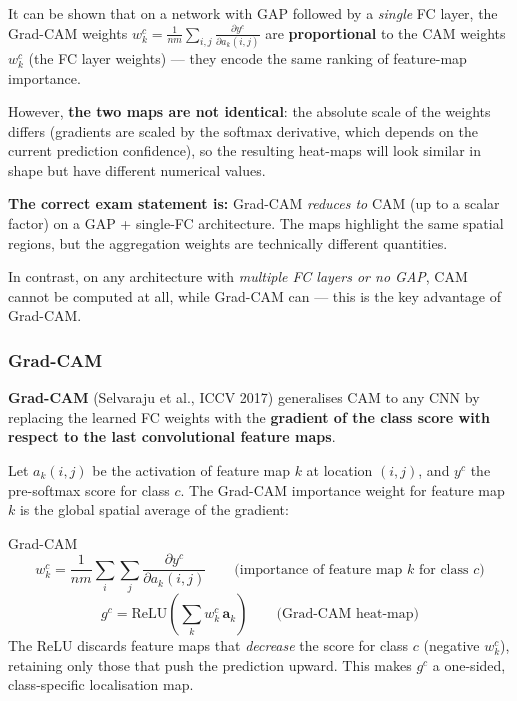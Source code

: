 \documentclass[11pt,a4paper]{article}
\newcommand{\term}[1]{\textcolor{DefGreen}{\textbf{#1}}\index{#1}}
\begin{document}
\begin{warnbox}
It can be shown that on a network with GAP followed by a \emph{single} FC layer, the Grad-CAM weights $w_k^c = \frac{1}{nm}\sum_{i,j}\frac{\partial y^c}{\partial a_k(i,j)}$ are \textbf{proportional} to the CAM weights $w_k^c$ (the FC layer weights) — they encode the same ranking of feature-map importance.

However, \textbf{the two maps are not identical}: the absolute scale of the weights differs (gradients are scaled by the softmax derivative, which depends on the current prediction confidence), so the resulting heat-maps will look similar in shape but have different numerical values.

\textbf{The correct exam statement is:} Grad-CAM \emph{reduces to} CAM (up to a scalar factor) on a GAP + single-FC architecture. The maps highlight the same spatial regions, but the aggregation weights are technically different quantities.

In contrast, on any architecture with \emph{multiple FC layers or no GAP}, CAM cannot be computed at all, while Grad-CAM can — this is the key advantage of Grad-CAM.
\end{warnbox}

\subsubsection{Grad-CAM}
\label{sec:gradcam2}

\term{Grad-CAM} (Selvaraju et al., ICCV 2017) generalises CAM to any CNN by replacing the learned FC weights with the \textbf{gradient of the class score with respect to the last convolutional feature maps}.

Let $a_k(i,j)$ be the activation of feature map $k$ at location $(i,j)$, and $y^c$ the pre-softmax score for class $c$. The Grad-CAM importance weight for feature map $k$ is the global spatial average of the gradient:

\begin{defbox}{Grad-CAM}
\[
w_k^c = \frac{1}{nm}\sum_i\sum_j \frac{\partial y^c}{\partial a_k(i,j)}
\qquad \text{(importance of feature map } k \text{ for class } c\text{)}
\]
\[
g^c = \mathrm{ReLU}\!\left(\sum_k w_k^c \, \mathbf{a}_k\right)
\qquad \text{(Grad-CAM heat-map)}
\]
The ReLU discards feature maps that \emph{decrease} the score for class $c$ (negative $w_k^c$), retaining only those that push the prediction upward. This makes $g^c$ a one-sided, class-specific localisation map.
\end{defbox}
\end{document}
